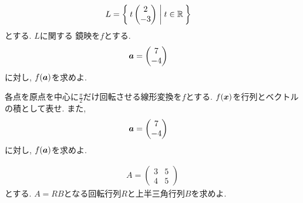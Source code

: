 \begin{quiz}
  \label{quiz:5:p:4}
  \begin{align*}
    L&=\Set{t\begin{pmatrix}2\\-3\end{pmatrix}|t\in\mathbb{R}}
  \end{align*}
  とする.
  $L$に関する
  鏡映を$f$とする.
  \begin{align*}
    \boldsymbol{a}&=\begin{pmatrix}7\\-4\end{pmatrix}
  \end{align*}
  に対し,
  $f(\boldsymbol{a})$を求めよ.
\end{quiz}

\begin{quiz} 
  各点を原点を中心に$\frac{\pi}{2}$だけ回転させる線形変換を$f$とする.
  $f(\boldsymbol{x})$を行列とベクトルの積として表せ.
  また, 
  \begin{align*}
    \boldsymbol{a}&=\begin{pmatrix}7\\-4\end{pmatrix}
  \end{align*}
  に対し,
  $f(\boldsymbol{a})$を求めよ.
\end{quiz}

\begin{quiz}
  \begin{align*}
    A=\begin{pmatrix}3&5\\4&5\end{pmatrix}
  \end{align*}
  とする.
  $A=RB$となる回転行列$R$と上半三角行列$B$を求めよ.
\end{quiz}



